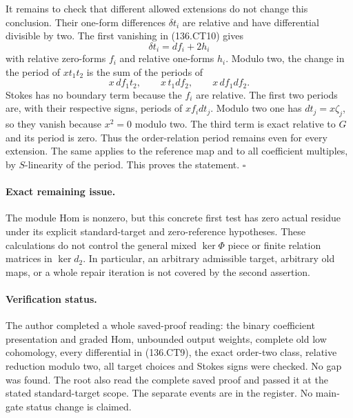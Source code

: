 It remains to check that different allowed extensions do
not change this conclusion.  Their one-form differences
$\delta t_i$ are relative and have differential divisible
by two.  The first vanishing in (136.CT10) gives
\[
                   \delta t_i=df_i+2h_i
 \tag{136.CT14}
\]
with relative zero-forms $f_i$ and relative one-forms $h_i$.
Modulo two, the change in the period of $x t_1t_2$ is
the sum of the periods of
\[
        x\,df_1t_2,\qquad x\,t_1df_2,
                               \qquad x\,df_1df_2.
 \tag{136.CT15}
\]
Stokes has no boundary term because the $f_i$ are relative.
The first two periods are, with their respective signs,
periods of $x f_i dt_j$.  Modulo two one has
$dt_j=x\zeta_j$, so they vanish because $x^2=0$ modulo
two.  The third term is exact relative to $G$ and its
period is zero.  Thus the order-relation period remains
even for every extension.  The same applies to the
reference map and to all coefficient multiples, by
$S$-linearity of the period.  This proves the statement.
\hfill$\square$

\paragraph{Exact remaining issue.}
The module Hom is nonzero, but this concrete first test has
zero actual residue under its explicit standard-target and
zero-reference hypotheses.  These calculations do not control the general mixed
$\ker\Phi$ piece or finite relation matrices in $\ker d_2$.  In particular, an arbitrary admissible
target, arbitrary old maps, or a whole repair iteration is
not covered by the second assertion.

\paragraph{Verification status.}
The author completed a whole saved-proof reading: the binary
coefficient presentation and graded Hom, unbounded output weights,
complete old low cohomology, every differential in (136.CT9),
the exact order-two class, relative reduction modulo two, all
target choices and Stokes signs were checked.  No gap was found.
The root also read the complete saved proof and passed it at
the stated standard-target scope. The separate events are in
the register. No main-gate status change is claimed.

